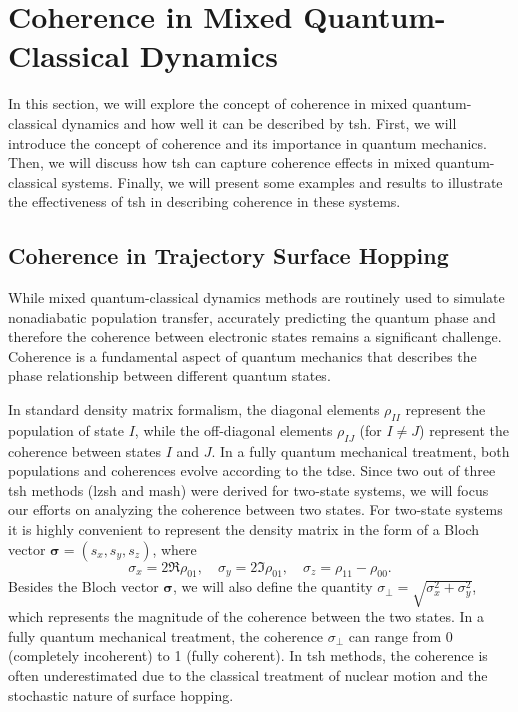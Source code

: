 \section{Coherence in Mixed Quantum-Classical Dynamics}\label{sec:coherence_in_mixed_qc_dynamics}
In this section, we will explore the concept of coherence in mixed quantum-classical dynamics and how well it can be described by \gls{tsh}. First, we will introduce the concept of coherence and its importance in quantum mechanics. Then, we will discuss how \gls{tsh} can capture coherence effects in mixed quantum-classical systems. Finally, we will present some examples and results to illustrate the effectiveness of \gls{tsh} in describing coherence in these systems.
\subsection{Coherence in Trajectory Surface Hopping}\label{sec:coherence_in_sh}
While mixed quantum-classical dynamics methods are routinely used to simulate nonadiabatic population transfer, accurately predicting the quantum phase and therefore the coherence between electronic states remains a significant challenge. Coherence is a fundamental aspect of quantum mechanics that describes the phase relationship between different quantum states.

In standard density matrix formalism, the diagonal elements $\rho_{II}$ represent the population of state $I$, while the off-diagonal elements $\rho_{IJ}$ (for $I\neq J$) represent the coherence between states $I$ and $J$. In a fully quantum mechanical treatment, both populations and coherences evolve according to the \gls{tdse}. Since two out of three \gls{tsh} methods (\gls{lzsh} and \gls{mash}) were derived for two-state systems, we will focus our efforts on analyzing the coherence between two states. For two-state systems it is highly convenient to represent the density matrix in the form of a Bloch vector $\symbf{\sigma}=(s_x,s_y,s_z)$, where
\begin{equation}
\sigma_x=2\Re\rho_{01},\quad\sigma_y=2\Im\rho_{01},\quad\sigma_z=\rho_{11}-\rho_{00}.
\end{equation}
Besides the Bloch vector $\symbf{\sigma}$, we will also define the quantity $\sigma_\perp=\sqrt{\sigma_x^2+\sigma_y^2}$, which represents the magnitude of the coherence between the two states. In a fully quantum mechanical treatment, the coherence $\sigma_\perp$ can range from 0 (completely incoherent) to 1 (fully coherent). In \gls{tsh} methods, the coherence is often underestimated due to the classical treatment of nuclear motion and the stochastic nature of surface hopping.

